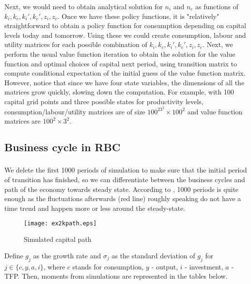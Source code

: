 \documentclass[]{article}
\begin{document}
Next, we would need to obtain analytical solution for $n_i$ and $n_c$ as functions of $k_i, k_c, k_i', k_c', z_i, z_c$. Once we have these policy functions, it is "relatively" straightforward to obtain a policy function for consumption depending on capital levels today and tomorrow. Using these we could create consumption, labour and utility matrices for each possible combination of $k_i, k_c, k_i', k_c', z_i, z_c$. Next, we perform the usual value function iteration to obtain the solution for the value function and optimal choices of capital next period, using transition matrix to compute conditional expectation of the initial guess of the value function matrix. However, notice that since we have four state variables, the dimensions of all the matrices grow quickly, slowing down the computation. For example, with 100 capital grid points and three possible states for productivity levels, consumption/labour/utility matrices are of size $100^23^2\times100^2$ and value function matrices are $100^2\times3^2$.

\subsection{Business cycle in RBC}

\subsubsection{}
We delete the first 1000 periods of simulation to make sure that the initial period of transition has finished, so we can differentiate between the business cycles and path of the economy towards steady state. According to , 1000 periods is quite enough as the fluctuations afterwards (red line) roughly speaking do not have a time trend and happen more or less around the steady-state.
\begin{figure}[h]
	\centering
	\texttt{[image: ex2kpath.eps]}
	\caption{Simulated capital path}
	\label{fig:ex2kpath}
\end{figure}

Define $g_j$ as the growth rate and $\sigma_j$ as the standard deviation of $g_j$ for $j\in\{c,y,a,i\}$, where $c$ stands for consumption, $y$ - output, $i$ - investment, $a$ - TFP. Then, moments from simulations are represented in the tables below.
\end{document}
